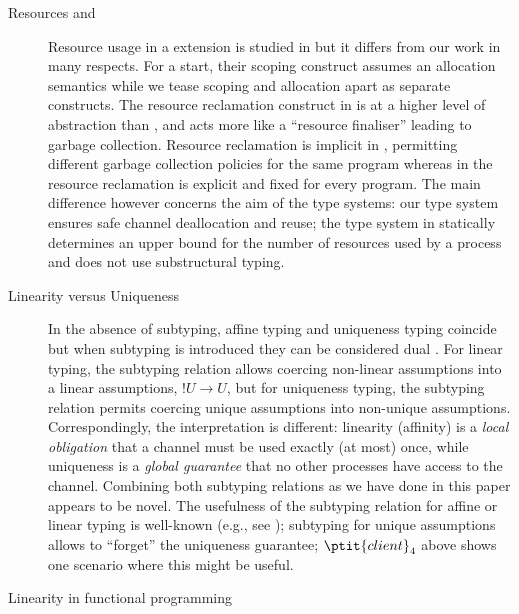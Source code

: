 \documentclass[copyright]{eptcs}
\begin{document}
\begin{description}

\item[Resources and \pic]
\label{sec:resources-pic}

Resource usage in a \pic extension is studied in \cite{teller:resourcespi} but
it differs from our work in many respects.  For a start, their scoping
construct assumes an allocation semantics while we tease scoping and
allocation apart as separate constructs.  The resource reclamation construct in
\cite{teller:resourcespi} is at a higher level of abstraction than ,
and acts more like a ``resource finaliser'' leading to garbage collection.
Resource reclamation is implicit in \cite{teller:resourcespi}, permitting
different garbage collection policies for the same program whereas in the
\picr resource reclamation is explicit and fixed for every program.  The main
difference however concerns the aim of the type systems: our  type system
ensures
safe channel deallocation and reuse;  the type system  in
\cite{teller:resourcespi} statically determines an upper bound for the number
of resources used by a process and does not use substructural typing.

\item[Linearity versus Uniqueness]

In the absence of subtyping, affine typing and uniqueness typing coincide but
when subtyping is introduced they can be considered dual
\cite{harrington:uniquenesslogic}. For linear typing, the subtyping relation
allows coercing non-linear assumptions into a linear assumptions, \ie $!U
\rightarrow U$, but for uniqueness typing, the subtyping relation permits
coercing unique assumptions into non-unique assumptions.  Correspondingly, the
interpretation is different: linearity (\resp affinity) is a \emph{local
obligation} that a channel must be used exactly (\resp at most) once, while
uniqueness is a \emph{global guarantee} that no other processes have access to
the channel. Combining both subtyping relations as we have done in this paper
appears to be novel.  The usefulness of the subtyping relation for affine or
linear typing is well-known (e.g., see \cite{kobayashi:typesystems}); subtyping
for unique assumptions allows to ``forget'' the uniqueness guarantee;
$\ptit{client}_4$ above shows one scenario where this might be useful. 

\item[Linearity in functional programming]


\end{description}
\end{document}
